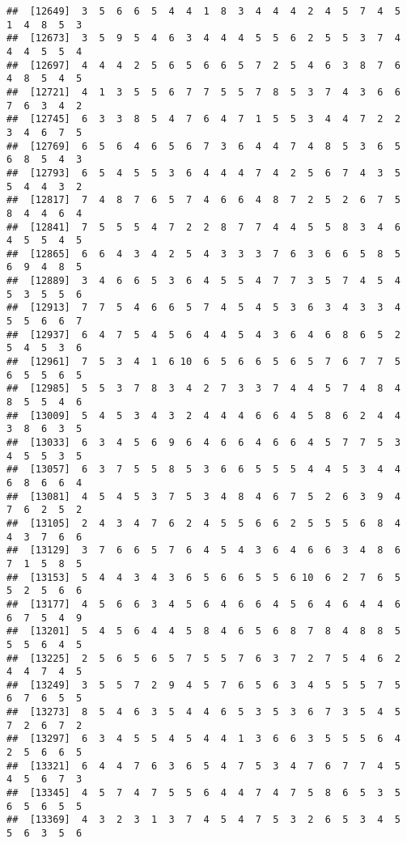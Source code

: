 \documentclass[
]{book}
\begin{document}
\begin{verbatim}
##  [12649]  3  5  6  6  5  4  4  1  8  3  4  4  4  2  4  5  7  4  5  1  4  8  5  3
##  [12673]  3  5  9  5  4  6  3  4  4  4  5  5  6  2  5  5  3  7  4  4  4  5  5  4
##  [12697]  4  4  4  2  5  6  5  6  6  5  7  2  5  4  6  3  8  7  6  4  8  5  4  5
##  [12721]  4  1  3  5  5  6  7  7  5  5  7  8  5  3  7  4  3  6  6  7  6  3  4  2
##  [12745]  6  3  3  8  5  4  7  6  4  7  1  5  5  3  4  4  7  2  2  3  4  6  7  5
##  [12769]  6  5  6  4  6  5  6  7  3  6  4  4  7  4  8  5  3  6  5  6  8  5  4  3
##  [12793]  6  5  4  5  5  3  6  4  4  4  7  4  2  5  6  7  4  3  5  5  4  4  3  2
##  [12817]  7  4  8  7  6  5  7  4  6  6  4  8  7  2  5  2  6  7  5  8  4  4  6  4
##  [12841]  7  5  5  5  4  7  2  2  8  7  7  4  4  5  5  8  3  4  6  4  5  5  4  5
##  [12865]  6  6  4  3  4  2  5  4  3  3  3  7  6  3  6  6  5  8  5  6  9  4  8  5
##  [12889]  3  4  6  6  5  3  6  4  5  5  4  7  7  3  5  7  4  5  4  5  3  5  5  6
##  [12913]  7  7  5  4  6  6  5  7  4  5  4  5  3  6  3  4  3  3  4  5  5  6  6  7
##  [12937]  6  4  7  5  4  5  6  4  4  5  4  3  6  4  6  8  6  5  2  5  4  5  3  6
##  [12961]  7  5  3  4  1  6 10  6  5  6  6  5  6  5  7  6  7  7  5  6  5  5  6  5
##  [12985]  5  5  3  7  8  3  4  2  7  3  3  7  4  4  5  7  4  8  4  8  5  5  4  6
##  [13009]  5  4  5  3  4  3  2  4  4  4  6  6  4  5  8  6  2  4  4  3  8  6  3  5
##  [13033]  6  3  4  5  6  9  6  4  6  6  4  6  6  4  5  7  7  5  3  4  5  5  3  5
##  [13057]  6  3  7  5  5  8  5  3  6  6  5  5  5  4  4  5  3  4  4  6  8  6  6  4
##  [13081]  4  5  4  5  3  7  5  3  4  8  4  6  7  5  2  6  3  9  4  7  6  2  5  2
##  [13105]  2  4  3  4  7  6  2  4  5  5  6  6  2  5  5  5  6  8  4  4  3  7  6  6
##  [13129]  3  7  6  6  5  7  6  4  5  4  3  6  4  6  6  3  4  8  6  7  1  5  8  5
##  [13153]  5  4  4  3  4  3  6  5  6  6  5  5  6 10  6  2  7  6  5  5  2  5  6  6
##  [13177]  4  5  6  6  3  4  5  6  4  6  6  4  5  6  4  6  4  4  6  6  7  5  4  9
##  [13201]  5  4  5  6  4  4  5  8  4  6  5  6  8  7  8  4  8  8  5  5  5  6  4  5
##  [13225]  2  5  6  5  6  5  7  5  5  7  6  3  7  2  7  5  4  6  2  4  4  7  4  5
##  [13249]  3  5  5  7  2  9  4  5  7  6  5  6  3  4  5  5  5  7  5  6  7  6  5  5
##  [13273]  8  5  4  6  3  5  4  4  6  5  3  5  3  6  7  3  5  4  5  7  2  6  7  2
##  [13297]  6  3  4  5  5  4  5  4  4  1  3  6  6  3  5  5  5  6  4  2  5  6  6  5
##  [13321]  6  4  4  7  6  3  6  5  4  7  5  3  4  7  6  7  7  4  5  4  5  6  7  3
##  [13345]  4  5  7  4  7  5  5  6  4  4  7  4  7  5  8  6  5  3  5  6  5  6  5  5
##  [13369]  4  3  2  3  1  3  7  4  5  4  7  5  3  2  6  5  3  4  5  5  6  3  5  6

\end{verbatim}
\end{document}
